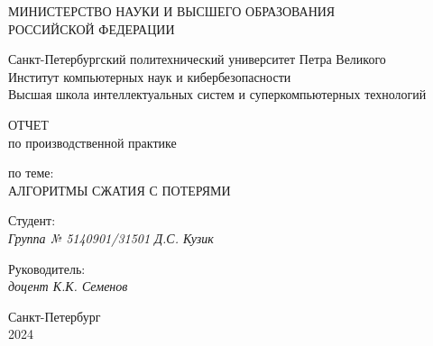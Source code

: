 \thispagestyle{empty}

\begin{center}
    МИНИСТЕРСТВО НАУКИ И ВЫСШЕГО ОБРАЗОВАНИЯ \\ РОССИЙСКОЙ ФЕДЕРАЦИИ

    \vspace{20pt}

    Санкт-Петербургский политехнический университет Петра Великого \\ Институт компьютерных наук и кибербезопасности \\
    Высшая школа интеллектуальных систем и суперкомпьютерных технологий \\

    \vspace{20pt}

\end{center}

\vfill

\begin{center}
    ОТЧЕТ \\  
    по производственной практике \\

    \vspace{20pt}

    по теме: \\
    \uppercase{Алгоритмы сжатия с потерями}
\end{center}

\vfill

    \noindent Студент: \\
    \textit{Группа № 5140901/31501 \hfill Д.С. Кузик}

    \vspace{20pt}

    \noindent Руководитель: \\
    \textit{доцент \hfill К.К. Семенов}

\vfill

\begin{center}
    Санкт-Петербург\\
    2024
\end{center}